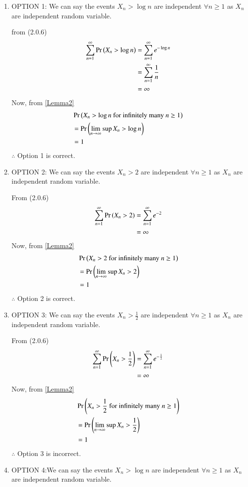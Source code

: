 \documentclass[journal,12pt,twocolumn]{IEEEtran}
\begin{document}
\begin{enumerate}
    \item OPTION 1: 
    We can say the events $X_n>\log n$ are independent $\forall n\geq 1$ as $X_n$ are independent random variable.
    
   from (2.0.6)
    \begin{align}
        \sum_{n=1}^{\infty}\Pr\left(X_n > \log n\right) &=\sum_{n=1}^{\infty}e^{-\log n}\\ &=\sum_{n=1}^{\infty}\frac{1}{n}\\
                                            &= \infty  
    \end{align}
    Now, from \eqref{Lemma2}
    \begin{align}
        &\Pr\left(X_n>\log n \text{ for infinitely many }n\geq1\right)\\
        &=\Pr\left(\lim_{n \rightarrow \infty}\sup X_n>\log n\right)\\
        &=1
    \end{align}
    $\therefore$ Option 1 is correct. 
    
    \item OPTION 2: We can say the events $X_n>2$ are independent $\forall n\geq 1$ as $X_n$ are independent random variable.
    
    From (2.0.6)
    \begin{align}
        \sum_{n=1}^{\infty}\Pr\left(X_n > 2\right) &= \sum_{n=1}^{\infty}e^{-2}\\
                                            &= \infty
    \end{align}
    Now, from \eqref{Lemma2}
    \begin{align}
        &\Pr\left(X_n>2 \text{ for infinitely many }n\geq1\right)\\
        &=\Pr\left(\lim_{n \rightarrow \infty}\sup X_n>2\right)\\
        &=1
    \end{align}
    $\therefore$ Option 2 is correct.
    
    \item OPTION 3: We can say the events $X_n>\frac{1}{2}$ are independent $\forall n\geq 1$ as $X_n$ are independent random variable.
    
    From (2.0.6)
    \begin{align}
        \sum_{n=1}^{\infty}\Pr\left(X_n > \frac{1}{2}\right) &= \sum_{n=1}^{\infty}e^{-\frac{1}{2}}\\
                                            &= \infty
    \end{align}
    Now, from \eqref{Lemma2}
    \begin{align}
        &\Pr\left(X_n>\frac{1}{2} \text{ for infinitely many }n\geq1\right)\\
        &=\Pr\left(\lim_{n \rightarrow \infty}\sup X_n>\frac{1}{2}\right)\\
        &=1
    \end{align}
    $\therefore$ Option 3 is incorrect.
    \item OPTION 4:We can say the events $X_n>\log n$ are independent $\forall n\geq 1$ as $X_n$ are independent random variable.
    

\end{enumerate}
\end{document}
